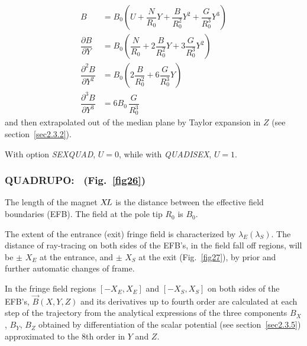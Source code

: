 \begin{align*}
	B &   =     B_0
	           \left(U+ \dfrac{N }{ R_0}Y + 
	                \dfrac{B }{ R^2_0} Y^2+ \dfrac{G }{ R^3_0} Y^3 \right)  \\
	\dfrac{ \partial B }{ \partial Y} 
	   &   =   B_0 \left(
	             \dfrac{N }{ R_0} + 2 \dfrac{B }{ R^2_0} Y + 3\dfrac{G }{ R^3_0}Y^2 \right) \\  
	\dfrac{ \partial^ 2B }{ \partial Y^2} 
	  &  =     B_0 \left(2 \dfrac{B }{ R^2_0} + 6\dfrac{G }{ R^3_0} Y \right) \\
	\dfrac{ \partial^ 3B }{ \partial Y^3}  
	   & =     6B_0 \,  \dfrac{G }{ R^3_0}
\end{align*}  
    and then extrapolated out of the median plane by Taylor expansion in $ Z $ 
(see section~\ref{sec2.3.2}).
\bigskip

\noindent With option \textsl{SEXQUAD}, $ U=0$,  while with \textsl{QUADISEX}, $U=1 $. 

\newpage

\subsubsection*{QUADRUPO:  \QUADRUPOTitl\  (Fig.~\protect\ref{fig26}) } \label{QUADRUPO}  

The length of the magnet $ X\!L $ is the distance between the
effective field boundaries (EFB). The field at the pole tip $ R_0 $ is $ B_0 $. 

\noindent The extent of the  entrance (exit) fringe field is characterized by 
$ \lambda_ E(\lambda_ S) $.  The distance of ray-tracing on both sides of the
EFB's, in the field fall off regions, will be $\pm$  $ X_E $ at 
the entrance, and $\pm$  $ X_S $ at the exit (Fig.~\ref{fig27}),  
by prior and further automatic 
changes of frame. 

\noindent In the fringe field  regions $[ -X_E,X_E ]$  and 
$[ -X_S,X_S ]$ on both sides of the EFB's, $ \vec  B(X,Y,Z) $ and its derivatives up to
fourth order are calculated at each step of the trajectory from the analytical expressions 
of the three components $ B_X $, $ B_Y $, $ B_Z $ obtained by differentiation
of the scalar potential (see section~\ref{sec2.3.5}) approximated to the 8th order in $ Y $ 
and $ Z $. 


